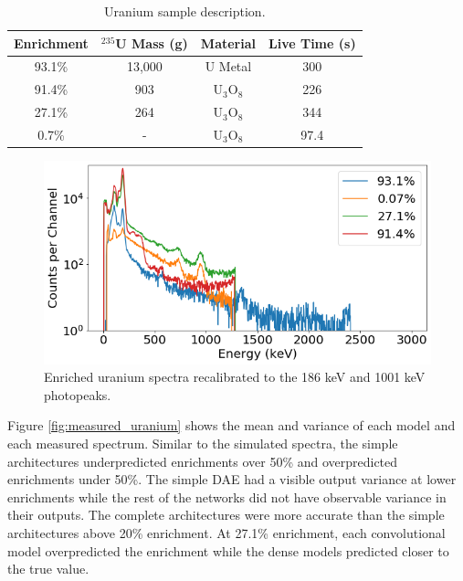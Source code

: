 \begin{table}[H]
\centering
\caption{Uranium sample description.}
\label{table:uranium_sample_description}
\begin{tabular}{cccc}
\hline
Enrichment & $^{235}$U Mass (g) & Material & Live Time (s)   \\ \hline
93.1\% & 13,000 & U Metal & 300 \\
91.4\% & 903 & U$_{3}$O$_{8}$ &  226\\
27.1\%  & 264 & U$_{3}$O$_{8}$ & 344 \\ 
0.7\% & - & U$_{3}$O$_{8}$ & 97.4 \\ \hline
\end{tabular}
\end{table}

\begin{figure}[H]
	\centering
	\includegraphics[width=0.8\linewidth]{images/measured_uranium_plots.png}
	\caption{Enriched uranium spectra recalibrated to the 186 keV and 1001 keV photopeaks.}
	\label{fig:measured_uranium_plots}
\end{figure}

Figure \ref{fig:measured_uranium} shows the mean and variance of each model and each measured spectrum. Similar to the simulated spectra, the simple architectures underpredicted enrichments over 50\% and overpredicted enrichments under 50\%. The simple DAE had a visible output variance at lower enrichments while the rest of the networks did not have observable variance in their outputs. The complete architectures were more accurate than the simple architectures above 20\% enrichment. At 27.1\% enrichment, each convolutional model overpredicted the enrichment while the dense models predicted closer to the true value. %



